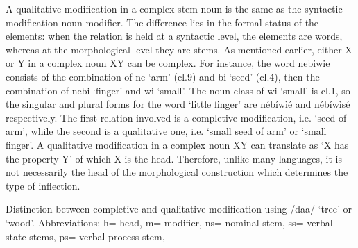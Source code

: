 \begin{exe}
\begin{exe}
\begin{exe}
\begin{exe}
\begin{exe}
\begin{exe}
A qualitative modification in a complex stem noun is the same as the  syntactic modification  noun-modifier. The difference lies in the formal status of the elements: when the relation is held at a syntactic level, the elements are words, whereas at the morphological level they are stems. As mentioned earlier,  either X or Y  in a complex noun XY can be complex. For instance, the word {\sls nebiwie} consists of the combination of {\sls ne}  `arm' ({\sc cl.9}) and {\sls bi} `seed' ({\sc cl.4}), then the combination of {\sls nebi} `finger' and {\sls wi} `small'. The noun class  of {\sls wi} `small'  is {\sc cl.1}, so the singular and plural forms for the word `little finger' are {\sls nébíwìé} and  {\sls nébíwìsé} respectively. The first relation involved is a completive modification, i.e. `seed  of arm', while the second is a qualitative one, i.e. `small seed  of arm' or `small finger'.  A qualitative modification in a complex noun XY can translate as `X has the property Y'  of which X is the head. Therefore, unlike many languages,  it is not necessarily the head of the morphological construction which determines the type of inflection.

\begin{table}

\centering
\caption[Distinction between completive and qualitative
modification]{Distinction between completive and qualitative
modification using /daa/ `tree' or `wood'.  Abbreviations: {\sc h}= head,  {\sc
m}=
modifier, {\sc ns}= nominal stem, {\sc ss}= verbal state stems,  {\sc ps}=
verbal process stem, \label{tab:GRM-complet-and-qualit}}

\end{table}
\end{exe}
\end{exe}
\end{exe}
\end{exe}
\end{exe}
\end{exe}
